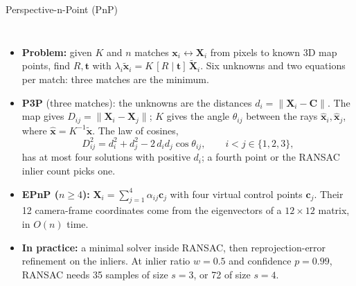 \begin{frame}{Perspective-n-Point (PnP)}
  \begin{columns}[T,onlytextwidth]
      \begin{itemize}\footnotesize\itemsep0.3em
        \item \textbf{Problem:} given $K$ and $n$ matches $\mathbf{x}_i\leftrightarrow\mathbf{X}_i$ from pixels to known 3D map points, find $R,\mathbf{t}$ with $\lambda_i\tilde{\mathbf{x}}_i=K\,[R\mid\mathbf{t}]\,\tilde{\mathbf{X}}_i$. Six unknowns and two equations per match: three matches are the minimum.
        \item \textbf{P3P} (three matches): the unknowns are the distances $d_i=\lVert\mathbf{X}_i-\mathbf{C}\rVert$. The map gives $D_{ij}=\lVert\mathbf{X}_i-\mathbf{X}_j\rVert$; $K$ gives the angle $\theta_{ij}$ between the rays $\hat{\mathbf{x}}_i,\hat{\mathbf{x}}_j$, where $\hat{\mathbf{x}}=K^{-1}\tilde{\mathbf{x}}$. The law of cosines,
        \[ D_{ij}^2=d_i^2+d_j^2-2\,d_i d_j\cos\theta_{ij},\qquad i<j\in\{1,2,3\}, \]
        has at most four solutions with positive $d_i$; a fourth point or the RANSAC inlier count picks one.
        \item \textbf{EPnP ($n\geq4$):} $\mathbf{X}_i=\sum_{j=1}^{4}\alpha_{ij}\mathbf{c}_j$ with four virtual control points $\mathbf{c}_j$. Their 12 camera-frame coordinates come from the eigenvectors of a $12\times12$ matrix, in $O(n)$ time.
        \item \textbf{In practice:} a minimal solver inside RANSAC, then reprojection-error refinement on the inliers. At inlier ratio $w=0.5$ and confidence $p=0.99$, RANSAC needs 35 samples of size $s=3$, or 72 of size $s=4$.
      \end{itemize}
      \centering
\end{columns}
\end{frame}

